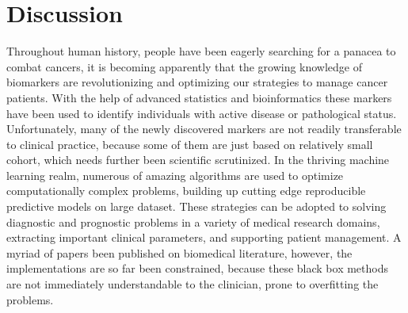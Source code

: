\documentclass[fleqn,10pt]{wlscirep}
\begin{document}
\section*{Discussion}
Throughout human history, people have been eagerly searching for a panacea to combat cancers, it is becoming apparently that the growing knowledge of biomarkers are revolutionizing and optimizing our strategies to manage cancer patients. With the help of advanced statistics and bioinformatics these markers have been used to identify individuals with active disease or pathological status. Unfortunately, many of the newly discovered markers are not readily transferable to clinical practice, because some of them are just based on relatively small cohort, which needs further been scientific scrutinized\cite{RN18}. In the thriving machine learning realm, numerous of amazing algorithms are used to optimize computationally complex problems, building up cutting edge reproducible predictive models on large dataset. These strategies can be adopted to solving diagnostic and prognostic problems in a variety of medical research domains, extracting important clinical parameters, and supporting patient management\cite{RN19}. A myriad of papers been published on biomedical literature, however, the implementations are so far been constrained, because these black box methods are not immediately understandable to the clinician, prone to overfitting the problems\cite{RN20}.
\end{document}
